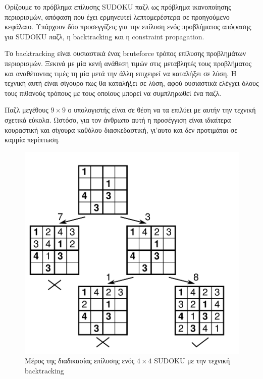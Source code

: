 \documentclass[12pt]{book}
\theoremstyle{definition}
\begin{document}
Ορίζουμε το πρόβλημα επίλυσης SUDOKU παζλ ως πρόβλημα ικανοποίησης περιορισμών, απόφαση που έχει ερμηνευτεί λεπτομερέστερα σε προηγούμενο κεφάλαιο. Υπάρχουν δύο προσεγγίζεις για την επίλυση ενός προβλήματος απόφασης για SUDOKU παζλ, η backtracking και η constraint propagation. \par

Το backtracking είναι ουσιαστικά ένας bruteforce τρόπος επίλυσης προβλημάτων περιορισμών. Ξεκινά με μία κενή ανάθεση τιμών στις μεταβλητές τους προβλήματος και αναθέτοντας τιμές τη μία μετά την άλλη επιχειρεί να καταλήξει σε λύση. Η τεχνική αυτή είναι σίγουρο πως θα καταλήξει σε λύση, αφού ουσιαστικά ελέγχει όλους τους πιθανούς τρόπους με τους οποίους μπορεί να συμπληρωθεί ένα παζλ. \par

Παζλ μεγέθους \(9 \times 9\) ο υπολογιστής είναι σε θέση να τα επιλύει με αυτήν την τεχνική σχετικά εύκολα. Ωστόσο, για τον άνθρωπο αυτή η προσέγγιση είναι ιδιαίτερα κουραστική και σίγουρα καθόλου διασκεδαστική, γι'αυτο και δεν προτιμάται σε καμμία περίπτωση. \par

\begin{figure}[h]
	\centering	
	\includegraphics[scale=0.45]{Figures/backtracking.png}
	\caption{Μέρος της διαδικασίας επίλυσης ενός \(4 \times 4\) SUDOKU με την τεχνική backtracking}
\end{figure}
\end{document}

